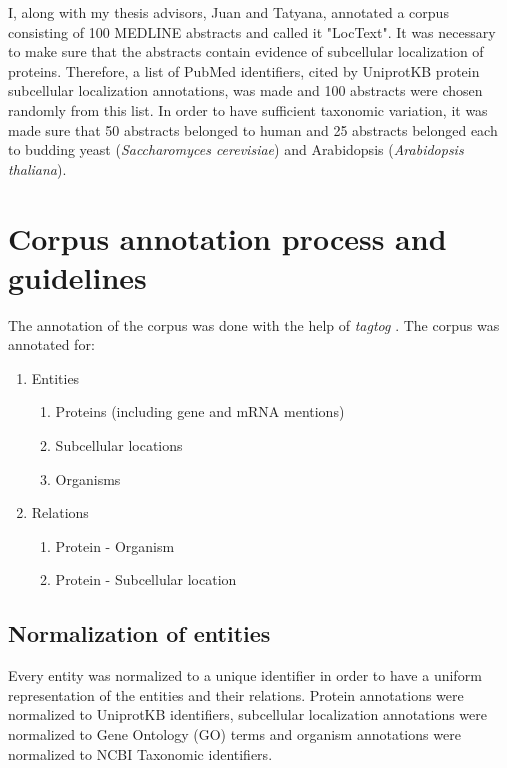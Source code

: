 I, along with my thesis advisors, Juan and Tatyana, annotated a corpus consisting of 100 MEDLINE \cite{medline} abstracts and called it "LocText". It was necessary to make sure that the abstracts contain evidence of subcellular localization of proteins. Therefore, a list of PubMed \cite{pubmed} identifiers, cited by UniprotKB \cite{magrane2011uniprot} protein subcellular localization annotations, was made and 100 abstracts were chosen randomly from this list. In order to have sufficient taxonomic variation, it was made sure that 50 abstracts belonged to human and 25 abstracts belonged each to budding yeast (\textit{Saccharomyces cerevisiae}) and Arabidopsis (\textit{Arabidopsis thaliana}).

\section{Corpus annotation process and guidelines}

The annotation of the corpus was done with the help of \textit{tagtog} \cite{cejuela2014tagtog}. The corpus was annotated for:

\begin{enumerate}
\item Entities
\begin{enumerate}
\item Proteins (including gene and mRNA mentions)
\item Subcellular locations
\item Organisms
\end{enumerate}
\item Relations
\begin{enumerate}
\item Protein - Organism
\item Protein - Subcellular location
\end{enumerate}
\end{enumerate}

\subsection*{Normalization of entities}

Every entity was normalized to a unique identifier in order to have a uniform representation of the entities and their relations. Protein annotations were normalized to UniprotKB \cite{magrane2011uniprot} identifiers, subcellular localization annotations were normalized to Gene Ontology (GO) \cite{ashburner2000gene} terms and organism annotations were normalized to NCBI Taxonomic \cite{ncbiTaxonomy} identifiers.

